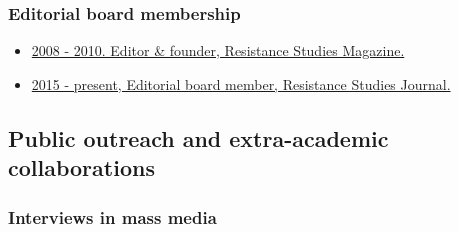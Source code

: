 \documentclass[a4paper,11pt,oneside]{article}
\begin{document}
    \subsubsection{Editorial board membership}
    \begin{itemize}
      \item \href{http://resistance-journal.org/the-old-rs-mag/}{2008 - 2010. Editor \& founder, Resistance Studies Magazine.}
      \item \href{http://resistance-journal.org/editorialboard/}{2015 - present, Editorial board member, Resistance Studies Journal.}
    \end{itemize}





\subsection{Public outreach and extra-academic collaborations}

    \subsubsection{Interviews in mass media}
\end{document}
